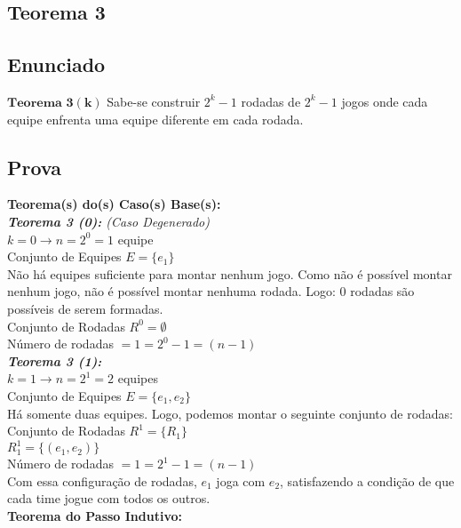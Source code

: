\documentclass[twoside]{article}
\begin{document}
\begin{multicols}{2}
\section{Teorema 3}

\subsection{ Enunciado }
\indent $\mathbf{Teorema}$ $\mathbf{3}$$\mathbf{(k)}$ Sabe-se construir $2^k - 1$ rodadas de $2^k - 1$ jogos onde cada equipe enfrenta uma equipe diferente em cada rodada.\\

\subsection{ Prova }
\indent 

\textbf{Teorema(s) do(s) Caso(s) Base(s):}\\

\textit{\textbf{Teorema 3 (0):} (Caso Degenerado)}\\
$ k=0 \rightarrow n=2^0=1$ equipe\\
Conjunto de Equipes $E = \{e_1\}$\\
Não há equipes suficiente para montar nenhum jogo. Como não é possível montar nenhum jogo, não é possível montar nenhuma rodada. Logo: 0 rodadas são possíveis de serem formadas.\\
Conjunto de Rodadas $R^0 = \emptyset$\\
Número de rodadas $= 1 = 2^0-1 = (n-1)$\\

\textit{\textbf{Teorema 3 (1):}}\\
$ k=1 \rightarrow n=2^1=2$ equipes\\
Conjunto de Equipes $E = \{e_1,e_2\}$\\
Há somente duas equipes. Logo, podemos montar o seguinte conjunto de rodadas:\\
Conjunto de Rodadas $R^1 = \{R_1\}$\\
 $R^1_1 =\{(e_1,e_2)\}$\\
Número de rodadas $= 1 = 2^1-1 = (n-1)$\\
Com essa configuração de rodadas, $e_1$ joga com $e_2$, satisfazendo a condição de que cada time jogue com todos os outros.\\

\textbf{Teorema do Passo Indutivo:}\\


\end{multicols}
\end{document}
